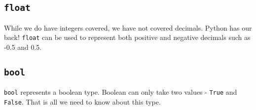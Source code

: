 \subsection{\texttt{float}}

While we do have integers covered, we have not covered decimals. Python has our back!
\texttt{float} can be used to represent both positive and negative decimals such as -0.5
and 0.5.

\subsection{\texttt{bool}}

\texttt{bool} represents a boolean type. Boolean can only take two values -
\texttt{True} and \texttt{False}. That is all we need to know about this
type.
